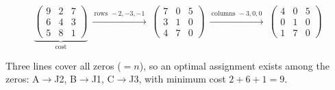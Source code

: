 \[
\underbrace{\begin{pmatrix} 9 & 2 & 7\\ 6 & 4 & 3\\ 5 & 8 & 1 \end{pmatrix}}_{\text{cost}}
\ \xrightarrow{\ \text{rows } -2,-3,-1\ }\
\begin{pmatrix} 7 & 0 & 5\\ 3 & 1 & 0\\ 4 & 7 & 0 \end{pmatrix}
\ \xrightarrow{\ \text{columns } -3,0,0\ }\
\begin{pmatrix} 4 & \boxed{0} & 5\\ \boxed{0} & 1 & 0\\ 1 & 7 & \boxed{0} \end{pmatrix}
\]
\begin{center}\small
Three lines cover all zeros ($= n$), so an optimal assignment exists among the zeros:
A$\to$J2, B$\to$J1, C$\to$J3, with minimum cost $2 + 6 + 1 = 9$.
\end{center}

